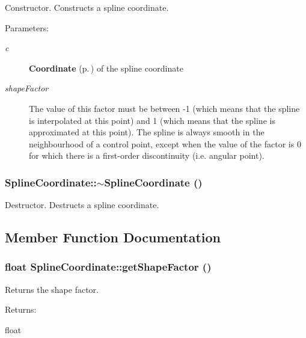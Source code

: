 Constructor. Constructs a spline coordinate. \begin{Desc}
\item[Parameters: ]\par
\begin{description}
\item[{\em 
c}]{\bf Coordinate} {\rm (p.\,\pageref{classCoordinate})} of the spline coordinate \item[{\em 
shape\-Factor}]The value of this factor must be between -1 (which means that the spline is interpolated at this point) and 1 (which means that the spline is approximated at this point). The spline is always smooth in the neighbourhood of a control point, except when the value of the factor is 0 for which there is a first-order discontinuity (i.e. angular point). \end{description}
\end{Desc}
\subsubsection{\setlength{\rightskip}{0pt plus 5cm}Spline\-Coordinate::$\sim$Spline\-Coordinate ()}\label{classSplineCoordinate_a3}


Destructor. Destructs a spline coordinate. 

\subsection{Member Function Documentation}
\subsubsection{\setlength{\rightskip}{0pt plus 5cm}float Spline\-Coordinate::get\-Shape\-Factor ()\hspace{0.3cm}{\tt  [inline]}}\label{classSplineCoordinate_a5}


Returns the shape factor. \begin{Desc}
\item[Returns: ]\par
float \end{Desc}
